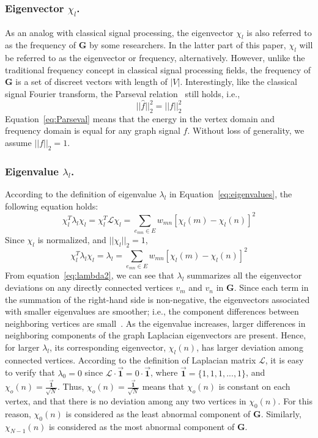 \subsubsection{Eigenvector $\chi_l$.}
As an analog with classical signal processing, the eigenvector $\chi_l$ is also referred to as
the  frequency of $\mathbf{G}$ by some researchers. In the latter part of this paper, $\chi_l$ will be referred to as the eigenvector or frequency, alternatively. However, unlike the traditional frequency concept in classical signal processing fields, the frequency of $\mathbf{G}$ is a set of discreet vectors with length of $|V|$. Interestingly, like the classical signal Fourier transform, the
Parseval relation~\cite{shuman2015vertex} still holds, i.e.,
\begin{equation}
\label{eq:Parseval}
||\hat{f}||_2^2=||f||_2^2
\end{equation}
Equation~\ref{eq:Parseval} means that the
energy in the vertex domain and frequency domain is equal for any graph signal $f$. Without loss of generality, we assume $||f||_2 =1$.

\subsubsection{Eigenvalue $\lambda_l$.}
According to the definition of eigenvalue $\lambda_l$  in Equation~\ref{eq:eigenvalues}, the following equation holds:
\begin{equation}
\label{eq:lambda1}
\chi_{l}^T\lambda_{l}\chi_{l}=\chi_{l}^T\mathcal{L}\chi_{l}= \sum_{e_{mn}\in E} w_
{mn}[\chi_{l}(m)-\chi_{l}(n)]^2
\end{equation}Since $\chi_{l}$ is normalized, and $||\chi_{l}||_2 =1$,
\begin{equation}
\label{eq:lambda2}
\chi_{l}^T\lambda_{l}\chi_{l}=\lambda_l= \sum_{e_{mn}\in E} w_
{mn}[\chi_{l}(m)-\chi_{l}(n)]^2
\end{equation}
From equation~\ref{eq:lambda2}, we can see that $\lambda_l$ summarizes all the eigenvector deviations on any directly connected vertices $v_m$ and $v_n$ in $\mathbf{G}$. Since each term in the summation of the right-hand side is non-negative, the eigenvectors associated with smaller eigenvalues are smoother; i.e., the component differences between neighboring vertices are
small~\cite{shuman2015vertex}. As the eigenvalue increases, larger differences in neighboring
components of the graph Laplacian eigenvectors are present.
Hence, for larger $\lambda_l$, its corresponding eigenvector, $\chi_l(n)$, has larger deviation among connected vertices. According to the definition of Laplacian matrix $\mathcal{L}$, it is easy to verify that $\lambda_0=0$ since $\mathcal{L}\cdot\vec{\textbf{1}}= 0\cdot\vec{\textbf{1}}$, where $\vec{\textbf{1}}=\{1,1,1,...,1\}$, and $\chi_o(n)=\frac{\vec{\textbf{1}}}{\sqrt{N}}$. Thus, $\chi_o(n)=\frac{\vec{\textbf{1}}}{\sqrt{N}}$ means that $\chi_o(n)$ is constant on each vertex, and that
there is no deviation among any two vertices in $\chi_0(n)$. For this reason, $\chi_0(n)$ is considered as the least abnormal component of $\mathbf{G}$. Similarly, $\chi_{N-1}(n)$ is considered as the most abnormal component of $\mathbf{G}$.



